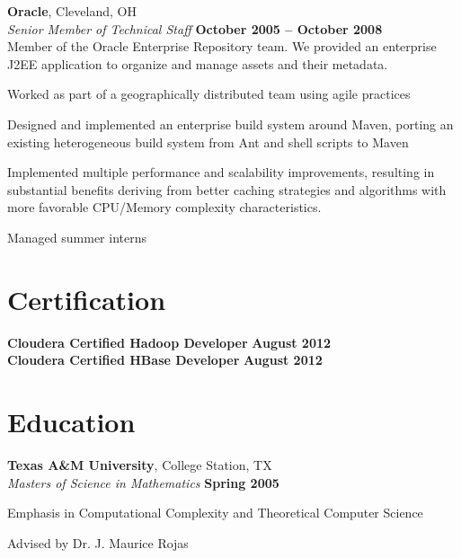 \documentclass[margin,line,12pt]{resume}
\begin{document}
\begin{resume}
    
    \textbf{Oracle}, Cleveland, OH \vspace{2mm}\\\vspace{1mm}%
    \textsl{Senior Member of Technical Staff} \hfill \textbf{October 2005 -- October 2008}\\
    Member of the Oracle Enterprise Repository team.  We provided an enterprise J2EE application to organize and manage assets and their metadata. 
    \begin{list2}
    \item Worked as part of a geographically distributed team using agile practices
    \item Designed and implemented an enterprise build system around Maven, porting an existing heterogeneous build system from Ant and shell scripts to Maven
    \item Implemented multiple performance and scalability improvements, resulting in substantial benefits deriving from better caching strategies and algorithms with more favorable CPU/Memory complexity characteristics.
    \item Managed summer interns
    \end{list2}
    \section{\mysidestyle Certification}
    \textbf{Cloudera Certified Hadoop Developer} \hfill \textbf{August 2012}\\
    \textbf{Cloudera Certified HBase Developer} \hfill \textbf{August 2012}
 
    \section{\mysidestyle Education}

    \textbf{Texas A\&M University}, College Station, TX \vspace{2mm}\\\vspace{1mm}%
    \textsl{Masters of Science in Mathematics} \hfill \textbf{ Spring 2005}\vspace{-3mm}\\\vspace{-1mm}%
    \begin{list2}
        \item Emphasis in Computational Complexity and Theoretical Computer Science
        \item Advised by Dr. J. Maurice Rojas
    \end{list2}\vspace{-1.5mm}
    

\end{resume}
\end{document}
